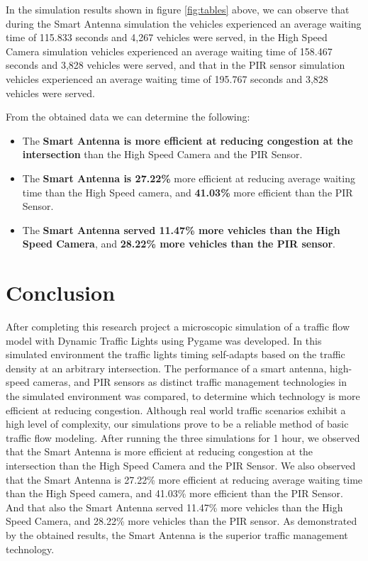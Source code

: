 \documentclass[12pt, a4paper,titlepage]{article}
\begin{document}
In the simulation results shown in figure \ref{fig:tables} above, we can observe that during the Smart Antenna simulation the vehicles experienced an average waiting time of 115.833 seconds and 4,267 vehicles were served, in the High Speed Camera simulation vehicles experienced an average waiting time of 158.467 seconds and 3,828 vehicles were served, and that in the PIR sensor simulation vehicles experienced an average waiting time of 195.767 seconds and 3,828 vehicles were served.

From the obtained data we can determine the following:

\begin{itemize}
	\item The \textbf{Smart Antenna is more efficient at reducing congestion at the intersection} than the High Speed Camera and the PIR Sensor.
	\item The \textbf{Smart Antenna is 27.22\%} more efficient at reducing average waiting time than the High Speed camera, and \textbf{41.03\%} more efficient than the PIR Sensor. 
	\item The \textbf{Smart Antenna served 11.47\% more vehicles than the High Speed Camera}, and \textbf{28.22\% more vehicles than the PIR sensor}.
\end{itemize}


\newpage
\section{Conclusion}
\label{sec_Conclusion}

After completing this research project a microscopic simulation of a traffic flow model with Dynamic Traffic Lights using Pygame was developed. In this simulated environment the traffic lights timing self-adapts based on the traffic density at an arbitrary intersection. The performance of a smart antenna, high-speed cameras, and PIR sensors as distinct traffic management technologies in the simulated environment was compared, to determine which technology is more efficient at reducing congestion. Although real world traffic scenarios exhibit a high level of complexity, our simulations prove to be a reliable method of basic traffic flow modeling. After running the three simulations for 1 hour, we observed that the Smart Antenna is more efficient at reducing congestion at the intersection than the High Speed Camera and the PIR Sensor. We also observed that the Smart Antenna is 27.22\% more efficient at reducing average waiting time than the High Speed camera, and 41.03\% more efficient than the PIR Sensor. And that also the Smart Antenna served 11.47\% more vehicles than the High Speed Camera, and 28.22\% more vehicles than the PIR sensor. As demonstrated by the obtained results, the Smart Antenna is the superior traffic management technology.
\end{document}
